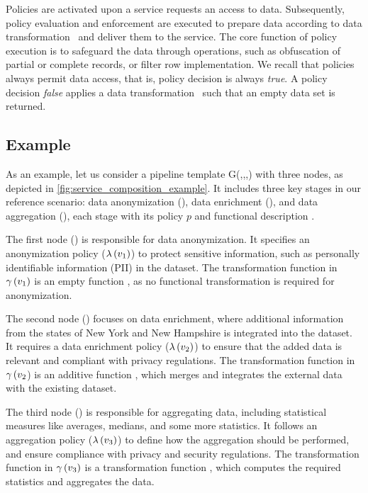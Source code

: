 Policies are activated upon a service requests an access to data. Subsequently, policy evaluation and enforcement are executed to prepare data according to data transformation \TP\ and deliver them to the service. The core function of policy execution is to safeguard the data through operations, such as obfuscation of partial or complete records, or filter row implementation. We recall that policies always permit data access, that is, policy decision is always \emph{true}. A policy decision \emph{false} applies a data transformation \TP\ such that an empty data set is returned.

\subsection{Example}\label{sec:example}
As an example, let us consider a pipeline template G(\V,\E,\myLambda,\myGamma) with three nodes, as depicted in \cref{fig:service_composition_example}.
It includes three key stages in our reference scenario: data anonymization (), data enrichment (), and data aggregation (), each stage with its policy $p$ and functional description \F.

The first node () is responsible for data anonymization. It specifies an anonymization policy ($\lambda\,(v_1)$) to protect sensitive information, such as personally identifiable information (PII) in the dataset. The transformation function  in $\gamma\,(v_1)$ is an empty function , as no functional transformation is required for anonymization.

The second node () focuses on data enrichment, where additional information from the states of New York and New Hampshire is integrated into the dataset. It requires a data enrichment policy ($\lambda\,(v_2)$) to ensure that the added data is relevant and compliant with privacy regulations. The transformation function  in $\gamma\,(v_2$) is an additive function , which merges and integrates the external data with the existing dataset.

The third node () is responsible for aggregating data, including statistical measures like averages, medians, and some more statistics. It follows an aggregation policy ($\lambda\,(v_3)$) to define how the aggregation should be performed, and ensure compliance with privacy and security regulations. The transformation function  in $\gamma\,(v_3)$ is a transformation function , which computes the required statistics and aggregates the data.

